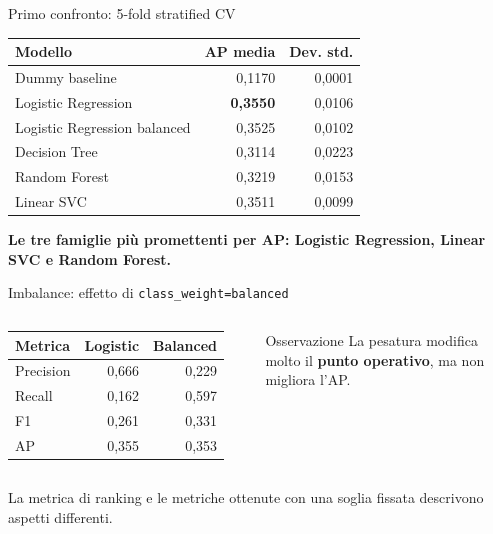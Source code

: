 \documentclass[10pt,aspectratio=169]{beamer}
\newcommand{\keypoint}[1]{\par\vspace{0.45em}\noindent{\color{teal}\rule{2.4pt}{1.25em}}\hspace{0.7em}\parbox[t]{0.92\linewidth}{\raggedright\textbf{#1}}}
\begin{document}
\begin{frame}{Primo confronto: 5-fold stratified CV}
\centering
\begin{tabular}{@{}lrr@{}}\toprule
\textbf{Modello} & \textbf{AP media} & \textbf{Dev. std.}\\\midrule
Dummy baseline & 0,1170 & 0,0001\\
Logistic Regression & \textbf{0,3550} & 0,0106\\
Logistic Regression balanced & 0,3525 & 0,0102\\
Decision Tree & 0,3114 & 0,0223\\
Random Forest & 0,3219 & 0,0153\\
Linear SVC & 0,3511 & 0,0099\\\bottomrule
\end{tabular}
\vspace{1em}
\keypoint{Le tre famiglie più promettenti per AP: Logistic Regression, Linear SVC e Random Forest.}
\end{frame}

\begin{frame}{Imbalance: effetto di \texttt{class\_weight=balanced}}
\begin{columns}[T,onlytextwidth]
\begin{tabular}{@{}lrr@{}}\toprule
\textbf{Metrica} & \textbf{Logistic} & \textbf{Balanced}\\\midrule
Precision & 0,666 & 0,229\\
Recall & 0,162 & 0,597\\
F1 & 0,261 & 0,331\\
AP & 0,355 & 0,353\\\bottomrule\end{tabular}
\begin{block}{Osservazione}
La pesatura modifica molto il \textbf{punto operativo}, ma non migliora l'AP.
\end{block}
\end{columns}
\vspace{1em}
{\small La metrica di ranking e le metriche ottenute con una soglia fissata descrivono aspetti differenti.}
\end{frame}
\end{document}
